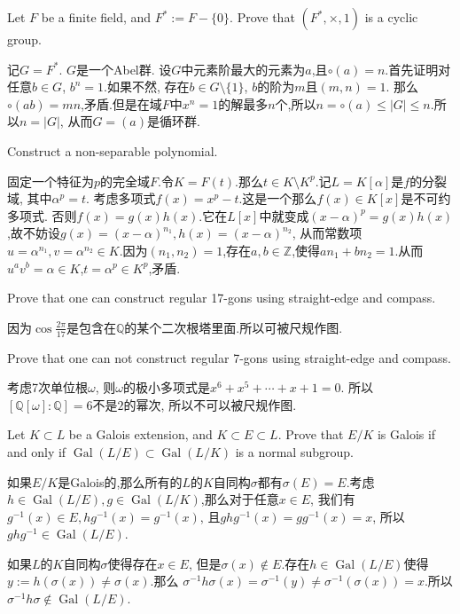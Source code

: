 \documentclass{exam-zh}
\newcommand{\ZZ}{{\mathbb{Z}}}
\newcommand{\QQ}{{\mathbb{Q}}}
\DeclareMathOperator{\gal}{Gal}
\begin{document}
\begin{question}
  Let $F$ be a finite field, and $F^*:=F-\{0\}$. Prove that $(F^*,\times,1)$ is a cyclic group.
\end{question}
\begin{solution}
  记$G=F^*$. $G$是一个Abel群. 设$G$中元素阶最大的元素为$a$,且$\circ(a)=n$.首先证明对任意$b\in G$, $b^n=1$.如果不然, 存在$b\in G\setminus\{1\}$, $b$的阶为$m$且$(m,n)=1$. 那么$\circ(ab)=mn$,矛盾.但是在域$F$中$x^n=1$的解最多$n$个,所以$n=\circ(a)\leq |G|\leq n$.所以$n=|G|$, 从而$G=(a)$是循环群.
\end{solution}
\begin{question}
  Construct a non-separable polynomial.
\end{question}
\begin{solution}
  固定一个特征为$p$的完全域$F$.令$K=F(t)$.那么$t\in K\setminus K^p$.记$L=K[\alpha]$是$f$的分裂域, 其中$\alpha^p=t$. 考虑多项式$f(x)=x^p-t$.这是一个那么$f(x)\in K[x]$是不可约多项式. 否则$f(x)=g(x)h(x)$.它在$L[x]$中就变成$(x-\alpha)^p=g(x)h(x)$,故不妨设$g(x)=(x-\alpha)^{n_1}, h(x)=(x-\alpha)^{n_2}$, 从而常数项$u=\alpha^{n_1},v=\alpha^{n_2}\in K$.因为$(n_1,n_2)=1$,存在$a,b\in\ZZ$,使得$an_1+bn_2=1$.从而$u^av^b=\alpha\in K$,$t=\alpha^p\in K^p$,矛盾.
\end{solution}
\begin{question}
  Prove that one can construct regular 17-gons using straight-edge and compass.
\end{question}
\begin{solution}
  因为$\cos\frac{2\pi}{17}$是包含在$\QQ$的某个二次根塔里面.所以可被尺规作图.
\end{solution}
\begin{question}
  Prove that one can not construct regular 7-gons using straight-edge and compass.
\end{question}
\begin{solution}
  考虑7次单位根$\omega$, 则$\omega$的极小多项式是$x^6+x^5+\cdots+x+1=0$. 所以$[\QQ[\omega]:\QQ]=6$不是$2$的幂次, 所以不可以被尺规作图.
\end{solution}
\begin{question}
  Let $K\subset L$ be a Galois extension, and $K\subset E\subset L$. Prove that $E/K$ is Galois if and only if $\gal(L/E)\subset \gal(L/K)$ is a normal subgroup.
\end{question}
\begin{solution}
  如果$E/K$是Galois的,那么所有的$L$的$K$自同构$\sigma$都有$\sigma(E)=E$.考虑$h\in \gal(L/E), g\in \gal(L/K)$,那么对于任意$x\in E$, 我们有$g^{-1}(x)\in E, hg^{-1}(x)=g^{-1}(x)$, 且$ghg^{-1}(x)=gg^{-1}(x)=x$, 所以$ghg^{-1}\in \gal(L/E)$.
  
  如果$L$的$K$自同构$\sigma$使得存在$x\in E$, 但是$\sigma(x)\notin E$.存在$h\in\gal(L/E)$使得$y:=h(\sigma(x))\neq\sigma(x)$.那么 $\sigma^{-1}h\sigma(x)=\sigma^{-1}(y)\neq\sigma^{-1}(\sigma(x))=x$.所以$\sigma^{-1}h\sigma\notin\gal(L/E)$.
\end{solution}
\end{document}
